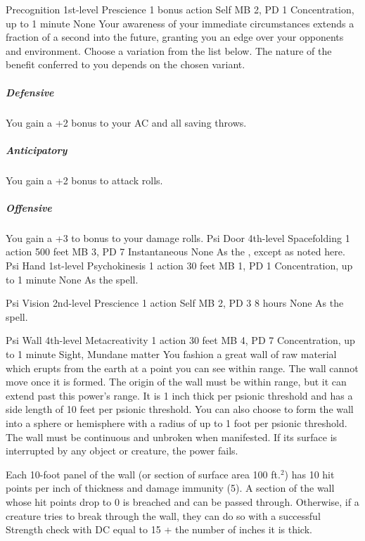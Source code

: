 \DndPowerHeader%
    {Precognition\label{pwr:precognition}}
    {1st-level Prescience}
    {1 bonus action}
    {Self}
    {MB 2, PD 1}
    {Concentration, up to 1 minute}
    {None}
Your awareness of your immediate circumstances extends
a fraction of a second into the future,
granting you an edge over your opponents and environment.
Choose a variation from the list below.
The nature of the benefit conferred to you
depends on the chosen variant.

\subparagraph{Defensive}
  You gain a +2 bonus to your AC and all saving throws.

\subparagraph{Anticipatory}
  You gain a +2 bonus to attack rolls.

\subparagraph{Offensive}
  You gain a +3 to bonus to your damage rolls.
\DndPowerHeader%
    {Psi Door\label{pwr:psi_door}}
    {4th-level Spacefolding}
    {1 action}
    {500 feet}
    {MB 3, PD 7}
    {Instantaneous}
    {None}
As the , except as
noted here.
\DndPowerHeader%
    {Psi Hand\label{pwr:psi_hand}}
    {1st-level Psychokinesis}
    {1 action}
    {30 feet}
    {MB 1, PD 1}
    {Concentration, up to 1 minute}
    {None}
As the  spell.

\DndPowerHeader%
    {Psi Vision\label{pwr:psi_vision}}
    {2nd-level Prescience}
    {1 action}
    {Self}
    {MB 2, PD 3}
    {8 hours}
    {None}
As the  spell.

\DndPowerHeader%
    {Psi Wall\label{pwr:psi_wall}}
    {4th-level Metacreativity}
    {1 action}
    {30 feet}
    {MB 4, PD 7}
    {Concentration, up to 1 minute}
    {Sight, Mundane matter}
You fashion a great wall of raw material
which erupts from the earth at a point you can see within
range. The wall cannot move once it is formed. The origin
of the wall must be within range, but it can extend past this
power's range. It is 1 inch thick per psionic threshold and
has a side length of 10 feet per psionic threshold. You can
also choose to form the wall into a sphere or hemisphere with
a radius of up to 1 foot per psionic threshold. The wall must
be continuous and unbroken when manifested. If its surface
is interrupted by any object or creature, the power fails.

Each 10-foot panel of the wall (or section of surface area
100 ft.$^2$) has 10 hit points per inch of thickness and damage
immunity (5). A section of the wall whose hit points drop
to 0 is breached and can be passed through. Otherwise, if
a creature tries to break through the wall, they can do so
with a successful Strength check with DC equal to 15 + the
number of inches it is thick.

